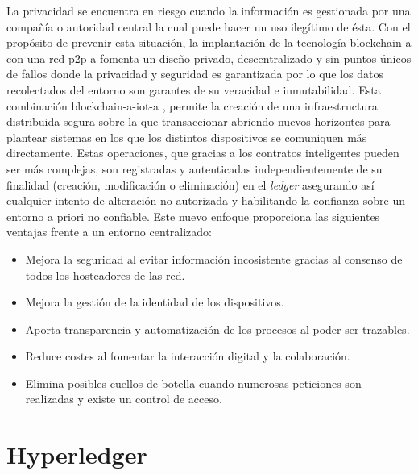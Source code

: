 \documentclass[12pt,a4paper, twoside]{report}
\begin{document}
	La privacidad se encuentra en riesgo cuando la información es gestionada por una compañía o autoridad central la cual puede hacer un uso ilegítimo de ésta. Con el propósito de prevenir esta situación, la implantación de la tecnología \gls{blockchain-a} con una red \gls{p2p-a} fomenta un diseño privado, descentralizado y sin puntos únicos de fallos donde la privacidad y seguridad es garantizada por lo que los datos recolectados del entorno son garantes de su veracidad e inmutabilidad. Esta combinación \gls{blockchain-a}-\gls{iot-a} \cite{iot2:2016}, \cite{iot1:2016} permite la creación de una infraestructura distribuida segura sobre la que transaccionar abriendo nuevos horizontes para plantear sistemas en los que los distintos dispositivos se comuniquen más directamente. Estas operaciones, que gracias a los contratos inteligentes pueden ser más complejas, son registradas y autenticadas independientemente de su finalidad (creación, modificación o eliminación) en el \textit{ledger} asegurando así cualquier intento de alteración no autorizada y habilitando la confianza sobre un entorno a priori no confiable. Este nuevo enfoque proporciona las siguientes ventajas frente a un entorno centralizado:
	
	\begin{itemize}
		\item Mejora la seguridad al evitar información incosistente gracias al consenso de todos los hosteadores de las red.
		\item Mejora la gestión de la identidad de los dispositivos.
		\item Aporta transparencia y automatización de los procesos al poder ser trazables.
		\item Reduce costes al fomentar la interacción digital y la colaboración.
		\item Elimina posibles cuellos de botella cuando numerosas peticiones son realizadas y existe un control de acceso.
	\end{itemize}
		
	\section{Hyperledger}
	
\end{document}

